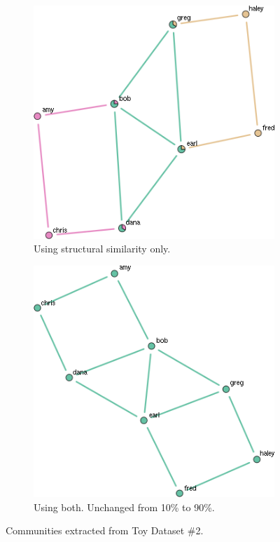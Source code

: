 \documentclass{report} %
\begin{document}
\begin{figure}
\centering
\begin{subfigure}{.5\textwidth}
  \centering
  \includegraphics[width=.8\linewidth]{toy3/no_ea/edge_comm.png}
  \caption{Using structural similarity only.}
  \label{fig:sub5}
\end{subfigure}%
\begin{subfigure}{.5\textwidth}
  \centering
  \includegraphics[width=.9\linewidth]{toy3/ea/edge_comm_0.25.png}
  \caption{Using both. Unchanged from 10\% to 90\%.}
  \label{fig:sub6}
\end{subfigure}
\caption{Communities extracted from Toy Dataset \#2.}
\label{fig:test3}
\end{figure}
\end{document}
